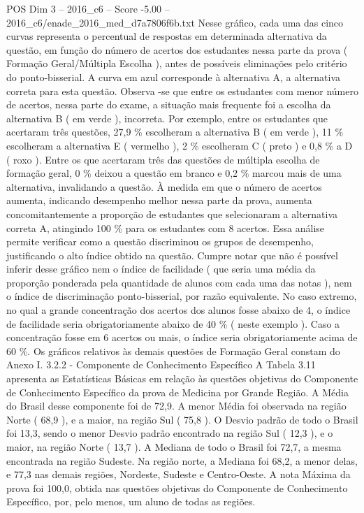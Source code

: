 \begin{textsample}{POS Dim 3 – 2016\_c6 – Score -5.00 – 2016\_c6/enade\_2016\_med\_d7a7806f6b.txt}
Nesse gráfico, cada uma das cinco curvas representa o percentual de respostas em determinada alternativa da questão, em função do número de acertos dos estudantes nessa parte da prova ( Formação Geral/Múltipla Escolha ), antes de possíveis eliminações pelo critério do ponto-bisserial.
A curva em azul corresponde à alternativa A, a alternativa correta para esta questão.
Observa -se que entre os estudantes com menor número de acertos, nessa parte do exame, a situação mais frequente foi a escolha da alternativa B ( em verde ), incorreta.
Por exemplo, entre os estudantes que acertaram três questões, 27,9 \% escolheram a alternativa B ( em verde ), 11 \% escolheram a alternativa E ( vermelho ), 2 \% escolheram C ( preto ) e 0,8 \% a D ( roxo ).
Entre os que acertaram três das questões de múltipla escolha de formação geral, 0 \% deixou a questão em branco e 0,2 \% marcou mais de uma alternativa, invalidando a questão.
À medida em que o número de acertos aumenta, indicando desempenho melhor nessa parte da prova, aumenta concomitantemente a proporção de estudantes que selecionaram a alternativa correta A, atingindo 100 \% para os estudantes com 8 acertos.
Essa análise permite verificar como a questão discriminou os grupos de desempenho, justificando o alto índice obtido na questão.
Cumpre notar que não é possível inferir desse gráfico nem o índice de facilidade ( que seria uma média da proporção ponderada pela quantidade de alunos com cada uma das notas ), nem o índice de discriminação ponto-bisserial, por razão equivalente.
No caso extremo, no qual a grande concentração dos acertos dos alunos fosse abaixo de 4, o índice de facilidade seria obrigatoriamente abaixo de 40 \% ( neste exemplo ).
Caso a concentração fosse em 6 acertos ou mais, o índice seria obrigatoriamente acima de 60 \%.
Os gráficos relativos às demais questões de Formação Geral constam do Anexo I. 3.2.2 - Componente de Conhecimento Específico A Tabela 3.11 apresenta as Estatísticas Básicas em relação às questões objetivas do Componente de Conhecimento Específico da prova de Medicina por Grande Região.
A Média do Brasil desse componente foi de 72,9.
A menor Média foi observada na região Norte ( 68,9 ), e a maior, na região Sul ( 75,8 ).
O Desvio padrão de todo o Brasil foi 13,3, sendo o menor Desvio padrão encontrado na região Sul ( 12,3 ), e o maior, na região Norte ( 13,7 ).
A Mediana de todo o Brasil foi 72,7, a mesma encontrada na região Sudeste.
Na região norte, a Mediana foi 68,2, a menor delas, e 77,3 nas demais regiões, Nordeste, Sudeste e Centro-Oeste.
A nota Máxima da prova foi 100,0, obtida nas questões objetivas do Componente de Conhecimento Específico, por, pelo menos, um aluno de todas as regiões.

\end{textsample}
